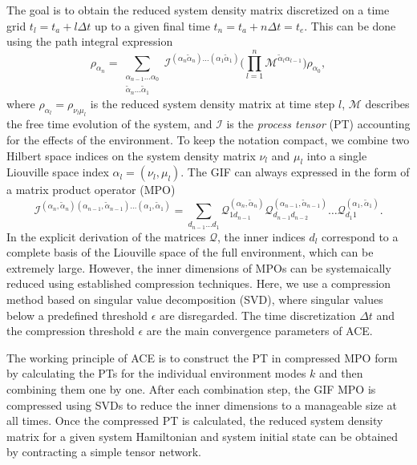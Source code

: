 \documentclass{scrartcl}
\begin{document}
The goal is to obtain the reduced system density matrix discretized on
a time grid $t_l = t_a + l \Delta t$ up to a given final time 
$t_n = t_a + n \Delta t = t_e$.
This can be done using the path integral expression
\begin{equation}
{\rho}_{\alpha_n}=
\sum_{\substack{\alpha_{n-1}\dots\alpha_0 \\
\tilde{\alpha}_n\dots\tilde{\alpha}_1}}
\mathcal{I}^{(\alpha_{n}\tilde{\alpha}_n)\dots(\alpha_1\tilde{\alpha}_1)}
\bigg(\prod_{l=1}^{n}
\mathcal{M}^{\tilde{\alpha}_{l}\alpha_{l-1}} \bigg)
{\rho}_{\alpha_0},
\end{equation}
where ${\rho}_{\alpha_l}={\rho}_{\nu_l \mu_l}$ is the reduced 
system density matrix at time step $l$, $\mathcal{M}$ describes the
free time evolution of the system, and $\mathcal{I}$ is the 
\emph{process tensor} (PT) accounting for the 
effects of the environment.
To keep the notation compact, we combine two Hilbert space indices
on the system density matrix $\nu_l$ and $\mu_l$ into a single 
Liouville space index $\alpha_l=(\nu_l, \mu_l)$.
The GIF can always expressed in the form of a matrix product operator (MPO)
%
\begin{equation}
\mathcal{I}^{(\alpha_{n},\tilde{\alpha}_{n})(\alpha_{n-1},\tilde{\alpha}_{n-1})
\dots (\alpha_{1},\tilde{\alpha}_{1})}
= 
\sum_{d_{n-1}\dots d_1}
\mathcal{Q}_{1 d_{n-1}}^{(\alpha_{n},\tilde{\alpha}_{n})}
\mathcal{Q}_{d_{n-1} d_{n-2}}^{(\alpha_{n-1},\tilde{\alpha}_{n-1})}\dots
\mathcal{Q}_{d_1 1}^{(\alpha_{1},\tilde{\alpha}_{1})}.
\end{equation}
In the explicit derivation of the matrices $\mathcal{Q}$, the inner indices
$d_l$ correspond to a complete basis of the Liouville space 
of the full environment, which can be extremely large. However, the inner 
dimensions of MPOs can be systemaically reduced using established compression 
techniques.
Here, we use a compression method based on singular value decomposition (SVD),
where singular values below a predefined threshold $\epsilon$ are disregarded.
The time discretization $\Delta t$ and the compression threshold $\epsilon$
are the main convergence parameters of ACE.

The working principle of ACE is to construct the PT in compressed MPO form
by calculating the PTs for the individual environment modes $k$ 
and then combining them one by one. 
After each combination step, the GIF MPO is compressed using
SVDs to reduce the inner dimensions to a manageable size at all times.
Once the compressed PT is calculated,
the reduced system density matrix for a given 
system Hamiltonian and system initial state can be obtained by contracting
a simple tensor network.
\end{document}
